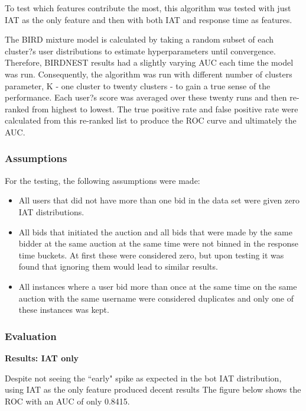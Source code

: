 \documentclass{article} %
\begin{document}
To test which features contribute the most, this algorithm was tested with just IAT as the only feature and then with both IAT and response time as features.

The BIRD mixture model is calculated by taking a random subset of each cluster?s user distributions to estimate hyperparameters until convergence. Therefore, BIRDNEST results had a slightly varying AUC each time the model was run. Consequently, the algorithm was run with different number of clusters parameter, K - one cluster to twenty clusters -  to gain a true sense of the performance. Each user?s score was averaged over these twenty runs and then re-ranked from highest to lowest. The true positive rate and false positive rate were calculated from this re-ranked list to produce the ROC curve and ultimately the AUC.

\subsubsection{Assumptions}

For the testing, the following assumptions were made:
\begin{itemize}
	\item All users that did not have more than one bid in the data set were given zero IAT distributions.
\item All bids that initiated the auction and all bids that were made by the same bidder at the same auction at the same time were not binned in the response time buckets. At first these were considered zero, but upon testing it was found that ignoring them would lead to similar results.
\item All instances where a user bid more than once at the same time on the same auction with the same username were considered duplicates and only one of these instances was kept.
\end{itemize}

\subsubsection{Evaluation}

\textbf{Results: IAT only}

Despite not seeing the ``early" spike as expected in the bot IAT distribution, using IAT as the only feature produced decent results
The figure below shows the ROC with an AUC of only 0.8415.
\end{document}
